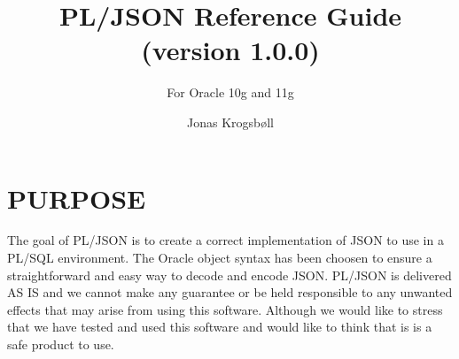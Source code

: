 \documentclass[11pt,a4paper]{article}
\title{PL/JSON Reference Guide (version 1.0.0)}
\subtitle{For Oracle 10g and 11g}
\author{Jonas Krogsbøll}
\date{}
\begin{document}
\maketitle
\vspace{2in}
\tableofcontents
\newpage

\section{PURPOSE}
The goal of PL/JSON is to create a correct implementation of JSON to use in a PL/SQL environment. The Oracle object syntax has been choosen to ensure a straightforward and easy way to decode and encode JSON. PL/JSON is delivered AS IS and we cannot make any guarantee or be held responsible to any unwanted effects that may arise from using this software. Although we would like to stress that we have tested and used this software and would like to think that is is a safe product to use.
\end{document}
